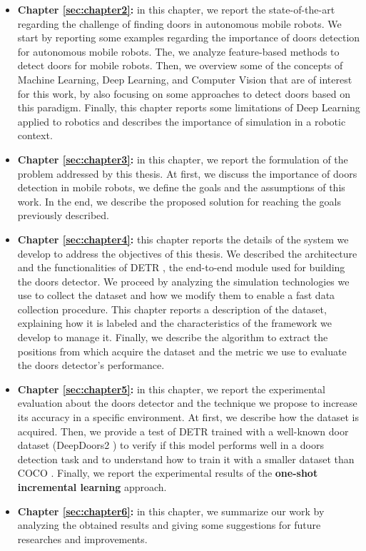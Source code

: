 \begin{itemize}
	\item \textbf{Chapter \ref{sec:chapter2}:} in this chapter, we report the state-of-the-art regarding the challenge of finding doors in autonomous mobile robots. We start by reporting some examples regarding the importance of doors detection for autonomous mobile robots. The, we analyze feature-based methods to detect doors for mobile robots. Then, we overview some of the concepts of Machine Learning, Deep Learning, and Computer Vision that are of interest for this work, by also focusing on some approaches to detect doors based on this paradigm. Finally, this chapter reports some limitations of Deep Learning applied to robotics and describes the importance of simulation in a robotic context.
	
	\item \textbf{Chapter \ref{sec:chapter3}:} in this chapter, we report the formulation of the problem addressed by this thesis. At first, we discuss the importance of doors detection in mobile robots, we define the goals and the assumptions of this work. In the end, we describe the proposed solution for reaching the goals previously described.
	
	\item \textbf{Chapter \ref{sec:chapter4}:} this chapter reports the details of the system we develop to address the objectives of this thesis. We described the architecture and the functionalities of DETR \cite{detr}, the end-to-end module used for building the doors detector. We proceed by analyzing the simulation technologies we use to collect the dataset and how we modify them to enable a fast data collection procedure. This chapter reports a description of the dataset, explaining how it is labeled and the characteristics of the framework we develop to manage it. Finally, we describe the algorithm to extract the positions from which acquire the dataset and the metric we use to evaluate the doors detector's performance.
	
	\item \textbf{Chapter \ref{sec:chapter5}:} in this chapter, we report the experimental evaluation about the doors detector and the technique we propose to increase its accuracy in a specific environment. At first, we describe how  the dataset is acquired. Then, we provide a test of DETR trained with a well-known door dataset (DeepDoors2 \cite{deepdoors2}) to verify if this model performs well in a doors detection task and to understand how to train it with a smaller dataset than COCO \cite{coco}. Finally, we report the experimental results of the \textbf{one-shot incremental learning} approach.
	
	\item \textbf{Chapter \ref{sec:chapter6}:} in this chapter, we summarize our work by analyzing the obtained results and giving some suggestions for future researches and improvements.
\end{itemize}
